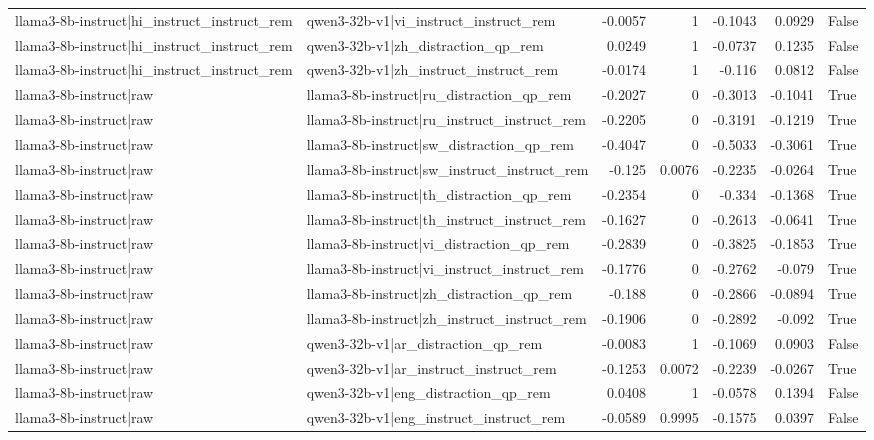 \begin{table}
\begin{tabular}{l l r r r r l}
llama3-8b-instruct|hi_instruct_instruct_rem & qwen3-32b-v1|vi_instruct_instruct_rem & -0.0057 & 1 & -0.1043 & 0.0929 & False \\
llama3-8b-instruct|hi_instruct_instruct_rem & qwen3-32b-v1|zh_distraction_qp_rem & 0.0249 & 1 & -0.0737 & 0.1235 & False \\
llama3-8b-instruct|hi_instruct_instruct_rem & qwen3-32b-v1|zh_instruct_instruct_rem & -0.0174 & 1 & -0.116 & 0.0812 & False \\
llama3-8b-instruct|raw & llama3-8b-instruct|ru_distraction_qp_rem & -0.2027 & 0 & -0.3013 & -0.1041 & True \\
llama3-8b-instruct|raw & llama3-8b-instruct|ru_instruct_instruct_rem & -0.2205 & 0 & -0.3191 & -0.1219 & True \\
llama3-8b-instruct|raw & llama3-8b-instruct|sw_distraction_qp_rem & -0.4047 & 0 & -0.5033 & -0.3061 & True \\
llama3-8b-instruct|raw & llama3-8b-instruct|sw_instruct_instruct_rem & -0.125 & 0.0076 & -0.2235 & -0.0264 & True \\
llama3-8b-instruct|raw & llama3-8b-instruct|th_distraction_qp_rem & -0.2354 & 0 & -0.334 & -0.1368 & True \\
llama3-8b-instruct|raw & llama3-8b-instruct|th_instruct_instruct_rem & -0.1627 & 0 & -0.2613 & -0.0641 & True \\
llama3-8b-instruct|raw & llama3-8b-instruct|vi_distraction_qp_rem & -0.2839 & 0 & -0.3825 & -0.1853 & True \\
llama3-8b-instruct|raw & llama3-8b-instruct|vi_instruct_instruct_rem & -0.1776 & 0 & -0.2762 & -0.079 & True \\
llama3-8b-instruct|raw & llama3-8b-instruct|zh_distraction_qp_rem & -0.188 & 0 & -0.2866 & -0.0894 & True \\
llama3-8b-instruct|raw & llama3-8b-instruct|zh_instruct_instruct_rem & -0.1906 & 0 & -0.2892 & -0.092 & True \\
llama3-8b-instruct|raw & qwen3-32b-v1|ar_distraction_qp_rem & -0.0083 & 1 & -0.1069 & 0.0903 & False \\
llama3-8b-instruct|raw & qwen3-32b-v1|ar_instruct_instruct_rem & -0.1253 & 0.0072 & -0.2239 & -0.0267 & True \\
llama3-8b-instruct|raw & qwen3-32b-v1|eng_distraction_qp_rem & 0.0408 & 1 & -0.0578 & 0.1394 & False \\
llama3-8b-instruct|raw & qwen3-32b-v1|eng_instruct_instruct_rem & -0.0589 & 0.9995 & -0.1575 & 0.0397 & False \\

\end{tabular}
\end{table}
